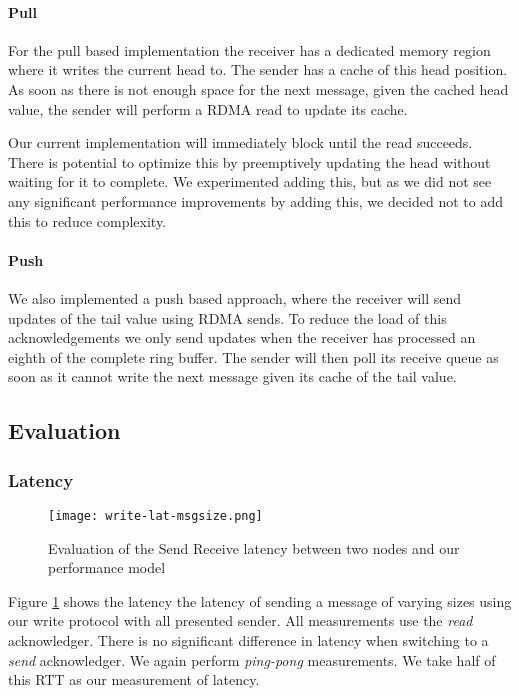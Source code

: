 \paragraph{Pull} For the pull based implementation the receiver has a dedicated memory region where it writes the current 
head to. The sender has a cache of this head position. As soon as there is not enough space for the next message, given 
the cached head value, the sender will perform a RDMA read to update its cache.

Our current implementation will immediately block until the read succeeds. There is potential to optimize this by preemptively 
updating the head without waiting for it to complete. We experimented adding this, but as we did not see any significant 
performance improvements by adding this, we decided not to add this to reduce complexity. 

\paragraph{Push} We also implemented a push based approach, where the receiver will send updates of the tail value using 
RDMA sends. To reduce the load of this acknowledgements we only send updates when the receiver has processed an eighth of 
the complete ring buffer. The sender will then poll its receive queue as soon as it cannot write the next message given its
cache of the tail value.

\subsection{Evaluation}

\subsubsection{Latency}

\begin{figure}[h]
\texttt{[image: write-lat-msgsize.png]}
\caption{Evaluation of the Send Receive latency between two nodes and our performance model}
\label{fig:plot-write-lat}
\end{figure}

Figure \ref{fig:plot-write-lat} shows the latency the latency of sending a message of varying sizes using our write protocol
with all presented sender. All measurements use the \emph{read} acknowledger. There is no significant difference in latency
when switching to a \emph{send} acknowledger. 
We again perform \emph{ping-pong} measurements. We take half of this RTT as our measurement of latency.


